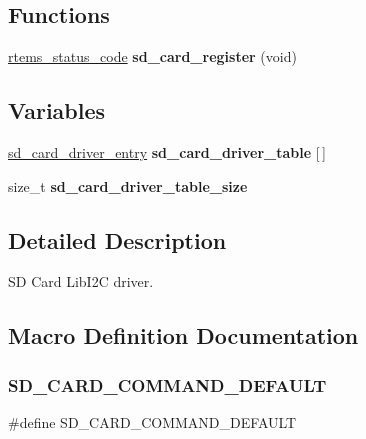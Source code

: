 \subsection*{Functions}
\begin{DoxyCompactItemize}
\item 
\mbox{\label{spi-sd-card_8h_aaaf1cf315366ca6aed59e4bece3e03da}} 
\mbox{\hyperlink{group__ClassicStatus_ga545d41846817eaba6143d52ee4d9e9fe}{rtems\+\_\+status\+\_\+code}} {\bfseries sd\+\_\+card\+\_\+register} (void)
\end{DoxyCompactItemize}
\subsection*{Variables}
\begin{DoxyCompactItemize}
\item 
\mbox{\label{spi-sd-card_8h_a8e671c49b15402ae0626a22c8377ee59}} 
\mbox{\hyperlink{structsd__card__driver__entry}{sd\+\_\+card\+\_\+driver\+\_\+entry}} {\bfseries sd\+\_\+card\+\_\+driver\+\_\+table} \mbox{[}$\,$\mbox{]}
\item 
\mbox{\label{spi-sd-card_8h_abfb7eb0a1e5456f088577400dae3ecaa}} 
size\+\_\+t {\bfseries sd\+\_\+card\+\_\+driver\+\_\+table\+\_\+size}
\end{DoxyCompactItemize}


\subsection{Detailed Description}
SD Card Lib\+I2C driver. 



\subsection{Macro Definition Documentation}
\mbox{\label{spi-sd-card_8h_a26b25e959c0dbc75cb095b4e932cb104}} 
\subsubsection{\texorpdfstring{SD\_CARD\_COMMAND\_DEFAULT}{SD\_CARD\_COMMAND\_DEFAULT}}
{\footnotesize\ttfamily \#define S\+D\+\_\+\+C\+A\+R\+D\+\_\+\+C\+O\+M\+M\+A\+N\+D\+\_\+\+D\+E\+F\+A\+U\+LT}

